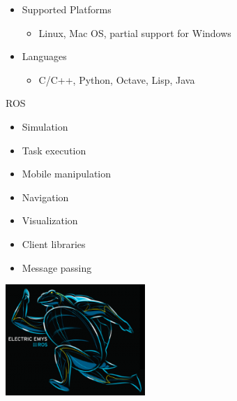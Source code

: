 \lyxframeend{}


\lyxframeend{}
\begin{itemize}
\item Supported Platforms

\begin{itemize}
\item Linux, Mac OS, partial support for Windows
\end{itemize}
\end{itemize}

\pause{}
\begin{itemize}
\item Languages

\begin{itemize}
\item C/C++, Python, Octave, Lisp, Java
\end{itemize}
\end{itemize}

\lyxframeend{}


\lyxframeend{}

\begin{minipage}[t]{0.45\textwidth}%
ROS
\begin{itemize}
\item Simulation
\item Task execution
\item Mobile manipulation
\item Navigation
\item Visualization
\item Client libraries
\item Message passing\end{itemize}
%
\end{minipage}%
\begin{minipage}[t][1\totalheight][c]{0.45\textwidth}%
\noindent \begin{center}
\includegraphics[width=1\columnwidth]{images/electric_200w_ROS}
\par\end{center}%
\end{minipage}


